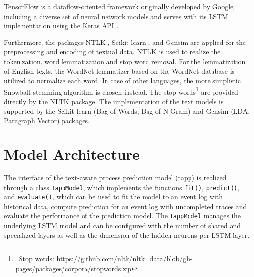 TensorFlow \cite{DBLP:journals/corr/AbadiABBCCCDDDG16} is a dataflow-oriented framework originally developed by Google, including a diverse set of neural network models and serves with its LSTM implementation using the Keras API \cite{chollet2015keras}.

Furthermore, the packages NTLK \cite{DBLP:books/daglib/0022921}, Scikit-learn \cite{DBLP:journals/jmlr/PedregosaVGMTGBPWDVPCBPD11}, and Gensim \cite{rehurek_lrec} are applied for the preprocessing and encoding of textual data.
NTLK is used to realize the tokenization, word lemmatization and stop word removal.
For the lemmatization of English texts, the WordNet lemmatizer based on the WordNet database \cite{miller1998wordnet} is utilized to normalize each word.
In case of other languages, the more simplistic Snowball stemming algorithm \cite{porter2001snowball} is chosen instead.
The stop words\footnote{\, Stop words: https://github.com/nltk/nltk\_data/blob/gh-pages/packages/corpora/stopwords.zip} are provided directly by the NLTK package.
The implementation of the text models is supported by the Scikit-learn (Bag of Words, Bag of N-Gram) and Gensim (LDA, Paragraph Vector) packages.


\section{Model Architecture}\label{sec:model-implementation}

The interface of the text-aware process prediction model (tapp) is realized through a class \texttt{TappModel}, which implements the functions \texttt{fit()},  \texttt{predict()}, and  \texttt{evaluate()}, which can be used to fit the model to an event log with historical data, compute prediction for an event log with uncompleted traces and evaluate the performance of the prediction model.
The \texttt{TappModel} manages the underlying LSTM model and can be configured with the number of shared and specialized layers as well as the dimension of the hidden neurons per LSTM layer.

